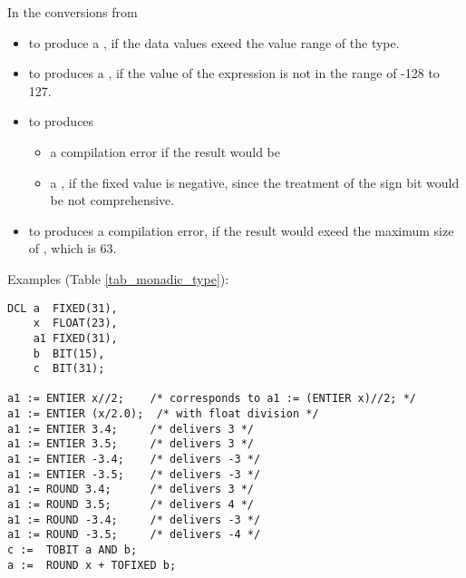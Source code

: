 In \OpenPEARL{} the conversions from 
\begin{itemize}
\item {} to  produce a 
, if the
data values exeed the value range of the  type.
\item {} to  produces a ,
if the value of the  expression is not
in the range of -128 to 127.
\item {} to  produces 
  \begin{itemize}
   \item a compilation error if the result would be 
   \item a , if the fixed value is negative, since
    the treatment of the sign bit would be not comprehensive.
  \end{itemize}
\item {} to  produces a compilation error, if the result 
would exeed the maximum size of , which is 63.

\end{itemize}


Examples (Table \ref{tab_monadic_type}):

\begin{lstlisting}
DCL a  FIXED(31),
    x  FLOAT(23),
    a1 FIXED(31),
    b  BIT(15),
    c  BIT(31);

a1 := ENTIER x//2;    /* corresponds to a1 := (ENTIER x)//2; */ 
a1 := ENTIER (x/2.0);  /* with float division */
a1 := ENTIER 3.4;     /* delivers 3 */ 
a1 := ENTIER 3.5;     /* delivers 3 */ 
a1 := ENTIER -3.4;    /* delivers -3 */
a1 := ENTIER -3.5;    /* delivers -3 */
a1 := ROUND 3.4;      /* delivers 3 */ 
a1 := ROUND 3.5;      /* delivers 4 */ 
a1 := ROUND -3.4;     /* delivers -3 */ 
a1 := ROUND -3.5;     /* delivers -4 */
c :=  TOBIT a AND b;
a :=  ROUND x + TOFIXED b; 
\end{lstlisting}
\FloatBarrier


